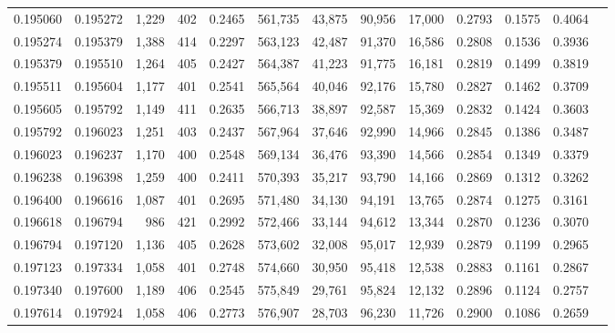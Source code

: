 \begin{tabular}{rrrrrrrrrrrrr}
0.195060 & 0.195272 & 1,229 & 402 &                                     0.2465 & 561,735 &  43,875 &  90,956 &  17,000 & 0.2793 & 0.1575 & 0.4064 \\
0.195274 & 0.195379 & 1,388 & 414 &                                     0.2297 & 563,123 &  42,487 &  91,370 &  16,586 & 0.2808 & 0.1536 & 0.3936 \\
0.195379 & 0.195510 & 1,264 & 405 &                                     0.2427 & 564,387 &  41,223 &  91,775 &  16,181 & 0.2819 & 0.1499 & 0.3819 \\
0.195511 & 0.195604 & 1,177 & 401 &                                     0.2541 & 565,564 &  40,046 &  92,176 &  15,780 & 0.2827 & 0.1462 & 0.3709 \\
0.195605 & 0.195792 & 1,149 & 411 &                                     0.2635 & 566,713 &  38,897 &  92,587 &  15,369 & 0.2832 & 0.1424 & 0.3603 \\
0.195792 & 0.196023 & 1,251 & 403 &                                     0.2437 & 567,964 &  37,646 &  92,990 &  14,966 & 0.2845 & 0.1386 & 0.3487 \\
0.196023 & 0.196237 & 1,170 & 400 &                                     0.2548 & 569,134 &  36,476 &  93,390 &  14,566 & 0.2854 & 0.1349 & 0.3379 \\
0.196238 & 0.196398 & 1,259 & 400 &                                     0.2411 & 570,393 &  35,217 &  93,790 &  14,166 & 0.2869 & 0.1312 & 0.3262 \\
0.196400 & 0.196616 & 1,087 & 401 &                                     0.2695 & 571,480 &  34,130 &  94,191 &  13,765 & 0.2874 & 0.1275 & 0.3161 \\
0.196618 & 0.196794 &   986 & 421 &                                     0.2992 & 572,466 &  33,144 &  94,612 &  13,344 & 0.2870 & 0.1236 & 0.3070 \\
0.196794 & 0.197120 & 1,136 & 405 &                                     0.2628 & 573,602 &  32,008 &  95,017 &  12,939 & 0.2879 & 0.1199 & 0.2965 \\
0.197123 & 0.197334 & 1,058 & 401 &                                     0.2748 & 574,660 &  30,950 &  95,418 &  12,538 & 0.2883 & 0.1161 & 0.2867 \\
0.197340 & 0.197600 & 1,189 & 406 &                                     0.2545 & 575,849 &  29,761 &  95,824 &  12,132 & 0.2896 & 0.1124 & 0.2757 \\
0.197614 & 0.197924 & 1,058 & 406 &                                     0.2773 & 576,907 &  28,703 &  96,230 &  11,726 & 0.2900 & 0.1086 & 0.2659 \\

\end{tabular}

